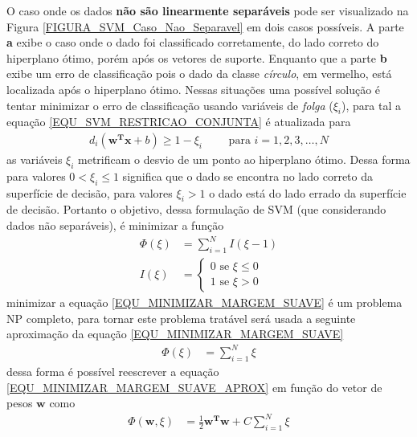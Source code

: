 O caso onde os dados \textbf{não são linearmente separáveis} pode ser visualizado na Figura \ref{FIGURA_SVM_Caso_Nao_Separavel} em dois casos possíveis. A parte \textbf{a} exibe o caso onde o dado foi classificado corretamente, do lado correto do hiperplano ótimo, porém após os vetores de suporte. Enquanto que a parte \textbf{b} exibe um erro de classificação pois o dado da classe \emph{círculo}, em vermelho, está localizada após o hiperplano ótimo. Nessas situações uma possível solução é tentar minimizar o erro de classificação usando variáveis de \emph{folga} (\(\xi_{i}\)), para tal a equação \eqref{EQU_SVM_RESTRICAO_CONJUNTA} é atualizada para 
\begin{align}
d_{i}(\mathbf{w^{T}}\mathbf{x} + b )  \geq 1 - \xi_{i} \qquad \textrm{ para } i = 1, 2, 3, \ldots, N
\end{align}
as variáveis \(\xi_{i}\) metrificam o desvio de um ponto ao hiperplano ótimo. Dessa forma para valores \(0 < \xi_{i} \leq 1\) significa que o dado se encontra no lado correto da superfície de decisão, para valores \(\xi_{i} > 1\) o dado está do lado errado da superfície de decisão. Portanto o objetivo, dessa formulação de SVM (que considerando dados não separáveis), é minimizar a função
\begin{align}
\Phi(\xi) &= \sum\limits_{i=1}^{N}I(\xi -1) \label{EQU_MINIMIZAR_MARGEM_SUAVE}\\
I(\xi) 	  &= \begin{cases}
				0 \textrm{ se } \xi \leq 0 \\
				1 \textrm{ se } \xi > 0 
			 \end{cases} 
\end{align}
minimizar a equação \eqref{EQU_MINIMIZAR_MARGEM_SUAVE} é um problema NP completo, para tornar este problema tratável será usada a seguinte aproximação da equação \eqref{EQU_MINIMIZAR_MARGEM_SUAVE}
\begin{align}
\Phi(\xi) &= \sum\limits_{i=1}^{N} \xi \label{EQU_MINIMIZAR_MARGEM_SUAVE_APROX}
\end{align}
dessa forma é possível reescrever a equação \eqref{EQU_MINIMIZAR_MARGEM_SUAVE_APROX} em função do vetor de pesos \(\mathbf{w}\) como
\begin{align}
\Phi(\mathbf{w}, \xi) &= \frac{1}{2}\mathbf{w^{T}}\mathbf{w} + C\sum\limits_{i=1}^{N} \xi \label{EQU_MINIMIZAR_MARGEM_SUAVE_APROX_SVM}
\end{align}

